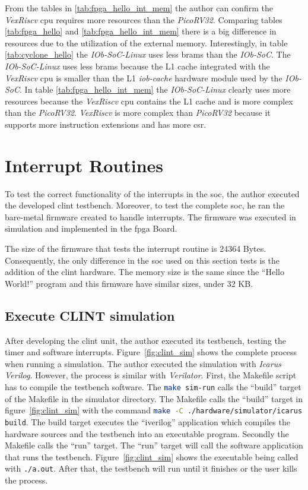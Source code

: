 From the tables in \ref{tab:fpga_hello_int_mem} the author can confirm the \textit{VexRiscv} \acrshort{cpu} requires more resources than the \textit{PicoRV32}. Comparing tables \ref{tab:fpga_hello} and \ref{tab:fpga_hello_int_mem} there is a big difference in resources due to the utilization of the external memory. Interestingly, in table \ref{tab:cyclone_hello} the \textit{IOb-SoC-Linux} uses less \acrshort{bram}s than the \textit{IOb-SoC}. The \textit{IOb-SoC-Linux} uses less \acrshort{bram}s because the L1 cache integrated with the \textit{VexRiscv} \acrshort{cpu} is smaller than the L1 \textit{iob-cache} hardware module used by the \textit{IOb-SoC}. In table \ref{tab:fpga_hello_int_mem} the \textit{IOb-SoC-Linux} clearly uses more resources because the \textit{VexRiscv} \acrshort{cpu} contains the L1 cache and is more complex than the \textit{PicoRV32}. \textit{VexRiscv} is more complex than \textit{PicoRV32} because it supports more instruction extensions and has more \acrlong{csr}.

\section{Interrupt Routines}
\label{section:interrupt_routine}
To test the correct functionality of the interrupts in the \acrshort{soc}, the author executed the developed \acrshort{clint} testbench. Moreover, to test the complete \acrshort{soc}, he ran the bare-metal firmware created to handle interrupts. The firmware was executed in simulation and implemented in the \acrshort{fpga} Board.

The size of the firmware that tests the interrupt routine is 24364 Bytes. Consequently, the only difference in the \acrshort{soc} used on this section tests is the addition of the \acrshort{clint} hardware. The memory size is the same since the \enquote{Hello World!} program and this firmware have similar sizes, under 32 KB.

\subsection{Execute CLINT simulation}
After developing the \acrshort{clint} unit, the author executed its testbench, testing the timer and software interrupts. Figure~\ref{fig:clint_sim} shows the complete process when running a simulation. The author executed the simulation with \textit{Icarus Verilog}. However, the process is similar with \textit{Verilator}. First, the Makefile script has to compile the testbench software. The \lstinline[language=bash]{make sim-run} calls the \enquote{build} target of the Makefile in the simulator directory. The Makefile calls the \enquote{build} target in figure~\ref{fig:clint_sim} with the command \lstinline[language=bash]{make -C ./hardware/simulator/icarus build}. The build target executes the \enquote{iverilog} application which compiles the hardware sources and the testbench into an executable program. Secondly the Makefile calls the \enquote{run} target. The \enquote{run} target will call the software application that runs the testbench. Figure~\ref{fig:clint_sim} shows the executable being called with \lstinline[language=bash]{./a.out}. After that, the testbench will run until it finishes or the user kills the process.

